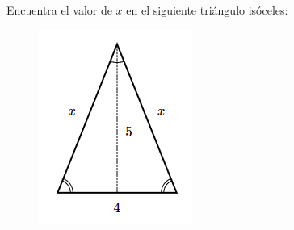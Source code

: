 Encuentra el valor de $x$ en el siguiente triángulo isóceles:

\begin{figure}[H]
    \centering
    \includegraphics[width=0.2\linewidth]{../images/pitagoras8.png}
    \caption{}
    \label{fig:pitagoras8}
\end{figure}
